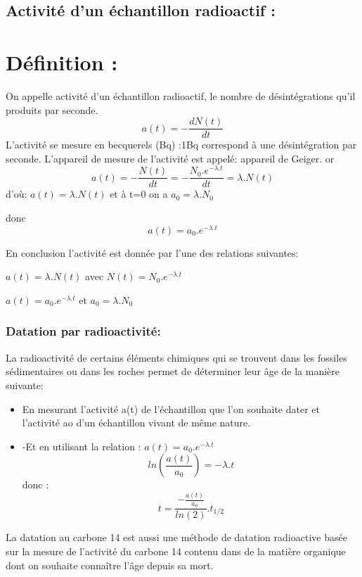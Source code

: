 \documentclass[12pt]{article}
\begin{document}
\subsection{Activité d'un échantillon radioactif : }
\section*{Définition : }
On appelle activité d'un échantillon radioactif, le nombre de désintégrations qu'il produits par seconde. $$a(t) = -\frac{dN(t)}{dt}$$
L'activité se mesure en becquerels (Bq) :1Bq correspond à une désintégration par seconde. L'appareil de mesure de l'activité est
appelé: appareil de Geiger.
or $$a(t) = -\frac{N(t)}{dt} = -\frac{N_0.e^{-\lambda.t}}{dt} = \lambda.N(t)$$
d’où: $a(t) = \lambda.N(t)$ et à t=0 on a $a_0 = \lambda.N_0$

donc $$a(t) = a_0.e^{-\lambda.t}$$

En conclusion l'activité est donnée par l'une des relations suivantes: 

$a(t) = \lambda.N(t)$ avec $N(t) = N_0.e^{-\lambda.t}$

$a(t) = a_0.e^{-\lambda.t}$ et $a_0 = \lambda.N_0$

\subsubsection{Datation par radioactivité: }

La radioactivité de certains éléments chimiques qui se trouvent dans les fossiles sédimentaires ou dans les roches permet de déterminer leur âge de la manière suivante:
\begin{itemize}


	\item En mesurant l'activité a(t) de l'échantillon que l'on souhaite dater et l'activité ao d'un échantillon vivant de même nature.
	\item -Et en utilisant la relation : $a(t) = a_0.e^{-\lambda.t}$
		$$ln(\frac{a(t)}{a_0}) = -\lambda.t$$
		donc : $$t = \frac{-\frac{a(t)}{a_0}}{ln(2)} . t_{1/2}$$
\end{itemize}
La datation au carbone 14 est aussi une méthode de datation radioactive basée sur la mesure de l'activité du carbone 14 contenu
dans de la matière organique dont on souhaite connaître l'âge depuis sa mort.
\end{document}
